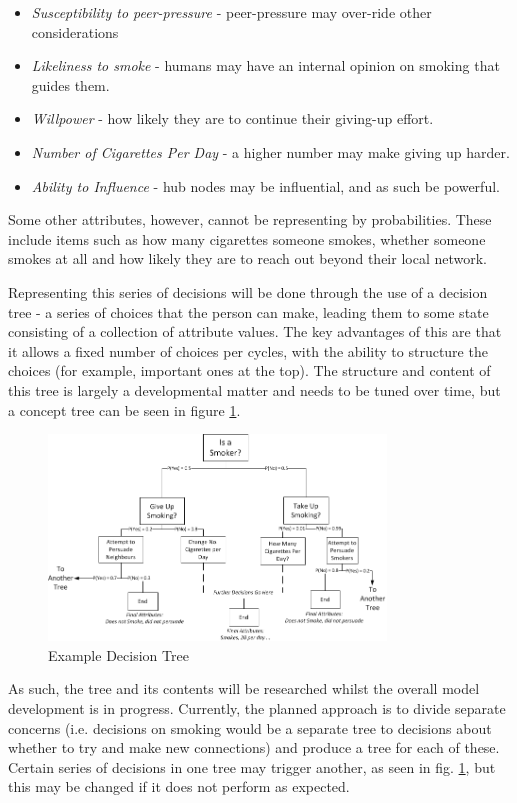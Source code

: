 \documentclass[]{article}
\begin{document}
\begin{itemize}
\item \emph{Susceptibility to peer-pressure} - peer-pressure may over-ride other considerations
\item \emph{Likeliness to smoke} - humans may have an internal opinion on smoking that guides them.
\item \emph{Willpower} - how likely they are to continue their giving-up effort.
\item \emph{Number of Cigarettes Per Day} - a higher number may make giving up harder.
\item \emph{Ability to Influence} - hub nodes may be influential, and as such be powerful.
\end{itemize}

Some other attributes, however, cannot be representing by probabilities. These include items such as how many cigarettes someone smokes, whether someone smokes at all and how likely they are to reach out beyond their local network.

Representing this series of decisions will be done through the use of a decision tree - a series of choices that the person can make, leading them to some state consisting of a collection of attribute values. The key advantages of this are that it allows a fixed number of choices per cycles, with the ability to structure the choices (for example, important ones at the top). The structure and content of this tree is largely a developmental matter and needs to be tuned over time, but a concept tree can be seen in figure \ref{fig:Sample decision tree}.


\begin{figure}
	\centering
		\includegraphics[width=0.80\textwidth]{sdt.jpg}
	\caption{Example Decision Tree}
	\label{fig:Sample decision tree}
\end{figure}

As such, the tree and its contents will be researched whilst the overall model development is in progress. Currently, the planned approach is to divide separate concerns (i.e. decisions on smoking would be a separate tree to decisions about whether to try and make new connections) and produce a tree for each of these. Certain series of decisions in one tree may trigger another, as seen in fig. \ref{fig:Sample decision tree}, but this may be changed if it does not perform as expected.
\end{document}
